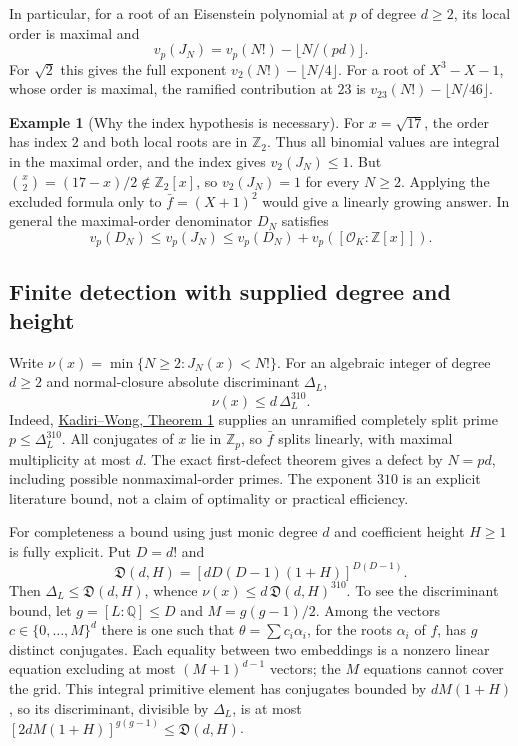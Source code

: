 \documentclass[11pt,a4paper]{article}
\theoremstyle{definition}
\newtheorem{example}[theorem]{Example}
\theoremstyle{remark}
\theoremstyle{plain}
\numberwithin{equation}{section}
\begin{document}
In particular, for a root of an Eisenstein polynomial at $p$ of
degree $d\ge2$, its local order is maximal and
\[
 v_p(J_N)=v_p(N!)-\lfloor N/(pd)\rfloor.
\]
For $\sqrt2$ this gives the full exponent
$v_2(N!)-\lfloor N/4\rfloor$.  For a root of $X^3-X-1$, whose
order is maximal, the ramified contribution at $23$ is
$v_{23}(N!)-\lfloor N/46\rfloor$.

\begin{example}[Why the index hypothesis is necessary]
For $x=\sqrt{17}$, the order has index $2$ and both local roots
are in $\mathbb Z_2$.  Thus all binomial values are integral in
the maximal order, and the index gives $v_2(J_N)\le1$.
But $\binom x2=(17-x)/2\notin\mathbb Z_2[x]$, so
$v_2(J_N)=1$ for every $N\ge2$.  Applying the excluded formula
only to $\bar f=(X+1)^2$ would give a linearly growing answer.
In general the maximal-order denominator $D_N$ satisfies
\[
 v_p(D_N)\le v_p(J_N)
 \le v_p(D_N)+v_p([\mathcal O_K:\mathbb Z[x]]).
\]
\end{example}

\subsection{Finite detection with supplied degree and height}

Write $\nu(x)=\min\{N\ge2:J_N(x)<N!\}$.
For an algebraic integer of degree $d\ge2$ and normal-closure
absolute discriminant $\Delta_L$,
\begin{equation}\label{sc:eq:effective-defect}
 \nu(x)\le d\,\Delta_L^{310}.
\end{equation}
Indeed, \href{https://arxiv.org/pdf/2105.14181}{Kadiri--Wong,
Theorem 1} supplies an unramified completely split prime
$p\le\Delta_L^{310}$.  All conjugates of $x$ lie in $\mathbb Z_p$,
so $\bar f$ splits linearly, with maximal multiplicity at most $d$.
The exact first-defect theorem gives a defect by $N=pd$, including
possible nonmaximal-order primes.  The exponent $310$ is an explicit
literature bound, not a claim of optimality or practical efficiency.

For completeness a bound using just monic degree $d$ and coefficient
height $H\ge1$ is fully explicit.  Put $D=d!$ and
\[
 \mathfrak D(d,H)=
 [dD(D-1)(1+H)]^{D(D-1)}.
\]
Then $\Delta_L\le\mathfrak D(d,H)$, whence
$\nu(x)\le d\,\mathfrak D(d,H)^{310}$.
To see the discriminant bound, let $g=[L:\mathbb Q]\le D$ and
$M=g(g-1)/2$.  Among the vectors $c\in\{0,\ldots,M\}^d$ there
is one such that $\theta=\sum c_i\alpha_i$, for the roots
$\alpha_i$ of $f$, has $g$ distinct conjugates.  Each equality
between two embeddings is a nonzero linear equation excluding at
most $(M+1)^{d-1}$ vectors; the $M$ equations cannot cover the
grid.  This integral primitive element has conjugates bounded by
$dM(1+H)$, so its discriminant, divisible by $\Delta_L$, is at most
$[2dM(1+H)]^{g(g-1)}\le\mathfrak D(d,H)$.
\end{document}

